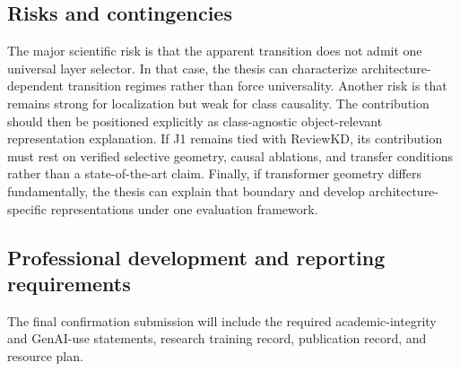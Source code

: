 \subsection{Risks and contingencies}

The major scientific risk is that the apparent transition does not admit one
universal layer selector. In that case, the thesis can characterize
architecture-dependent transition regimes rather than force universality.
Another risk is that \methodname{} remains strong for localization but weak for
class causality. The contribution should then be positioned explicitly as
class-agnostic object-relevant representation explanation. If J1 remains tied
with ReviewKD, its contribution must rest on verified selective geometry,
causal ablations, and transfer conditions rather than a state-of-the-art claim.
Finally, if transformer geometry differs fundamentally, the thesis can explain
that boundary and develop architecture-specific representations under one
evaluation framework.

\subsection{Professional development and reporting requirements}

The final confirmation submission will include the required academic-integrity
and GenAI-use statements, research training record, publication record, and
resource plan.

